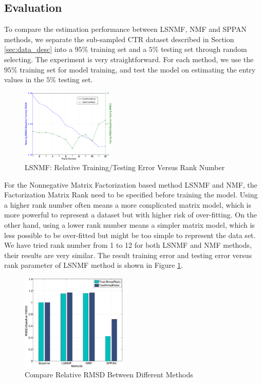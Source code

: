 \subsection{Evaluation}
To compare the estimation performance between LSNMF, NMF and SPPAN
methods, we separate the sub-sampled CTR dataset described in Section
\ref{sec:data_desc} into a $95\%$ training set and a $5\%$ testing set
through random selecting. The experiment is very straightforward. For
each method, we use the $95\%$ training set for model training, and
test the model on estimating the entry values in the $5\%$ testing
set.

\begin{figure}[!ht]
  \centering
  \includegraphics[width=0.4\textwidth]{figures/learning_curve_lsnmf_subsample_relative.eps}
  \caption{LSNMF: Relative Training/Testing Error Versus Rank Number}
  \label{fig:lsnmf_learning}
\end{figure}

For the Nonnegative Matrix Factorization based method LSNMF and NMF,
the Factorization Matrix Rank need to be specified before training the
model. Using a higher rank number often means a more complicated
matrix model, which is more powerful to represent a dataset but with
higher risk of over-fitting. On the other hand, using a lower rank
number means a simpler matrix model, which is less possible to be
over-fitted but might be too simple to represent the data set. We have
tried rank number from 1 to 12 for both LSNMF and NMF methods, their
results are very similar. The result training error and testing error
versus rank parameter of LSNMF method is shown in Figure
\ref{fig:lsnmf_learning}.

\begin{figure}[!ht]
  \centering
  \includegraphics[width=0.45\textwidth]{figures/methos_comparison_all_relative.eps}
  \caption{Compare Relative RMSD Between Different Methods}
  \label{fig:rmsd_compare}
\end{figure}

